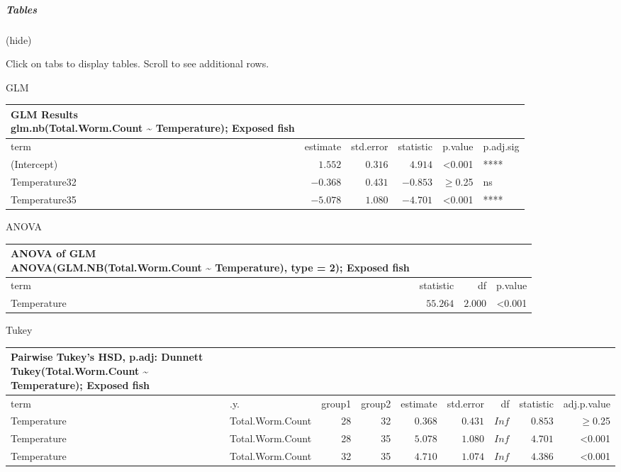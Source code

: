 \documentclass[
]{article}
\begin{document}
\subparagraph{Tables}\label{tables-4}

(hide)

Click on tabs to display tables. Scroll to see additional rows.

GLM

\begin{longtable}{lrrrrl}
\caption*{
{\large GLM Results} \\ 
{\small glm.nb(Total.Worm.Count \textasciitilde{} Temperature); Exposed fish}
} \\ 
\toprule
term & estimate & std.error & statistic & p.value & p.adj.sig \\ 
\midrule\addlinespace[2.5pt]
(Intercept) & $1.552$ & $0.316$ & $4.914$ & <0.001 & **** \\ 
Temperature32 & $-0.368$ & $0.431$ & $-0.853$ & $\geq$0.25 & ns \\ 
Temperature35 & $-5.078$ & $1.080$ & $-4.701$ & <0.001 & **** \\ 
\bottomrule
\end{longtable}

ANOVA

\begin{longtable}{lrrr}
\caption*{
{\large ANOVA of GLM} \\ 
{\small ANOVA(GLM.NB(Total.Worm.Count \textasciitilde{} Temperature), type = 2); Exposed fish}
} \\ 
\toprule
term & statistic & df & p.value \\ 
\midrule\addlinespace[2.5pt]
Temperature & $55.264$ & $2.000$ & <0.001 \\ 
\bottomrule
\end{longtable}

Tukey

\begin{longtable}{llrrrrrrr}
\caption*{
{\large Pairwise Tukey's HSD, p.adj: Dunnett} \\ 
{\small Tukey(Total.Worm.Count \textasciitilde{} Temperature); Exposed fish}
} \\ 
\toprule
term & .y. & group1 & group2 & estimate & std.error & df & statistic & adj.p.value \\ 
\midrule\addlinespace[2.5pt]
Temperature & Total.Worm.Count & 28 & 32 & $0.368$ & $0.431$ & $ Inf$ & $0.853$ & $\geq$0.25 \\ 
Temperature & Total.Worm.Count & 28 & 35 & $5.078$ & $1.080$ & $ Inf$ & $4.701$ & <0.001 \\ 
Temperature & Total.Worm.Count & 32 & 35 & $4.710$ & $1.074$ & $ Inf$ & $4.386$ & <0.001 \\ 
\bottomrule
\end{longtable}
\end{document}
